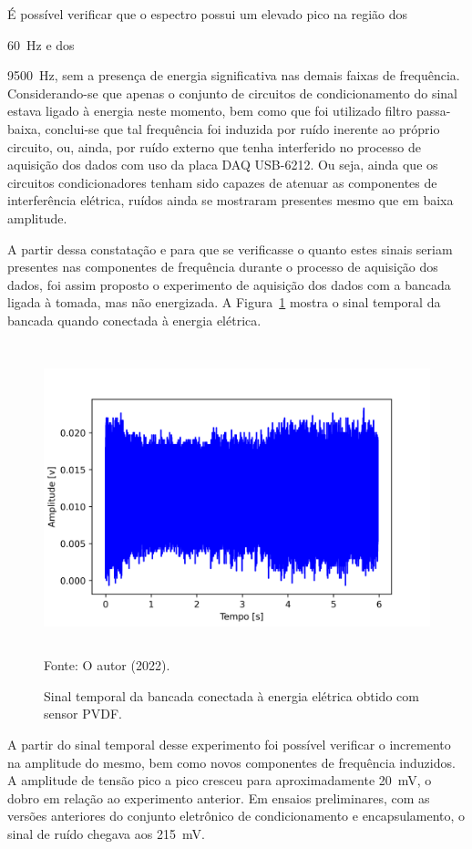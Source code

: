 \documentclass[
	12pt,				
	oneside,			
	a4paper,			
	english,			
	brazil,	
	sumario=abnt-6027-2012		
	]{abntex2ppgsi}
\begin{document}
É possível verificar que o espectro possui um elevado pico na região dos {\SI{60}{\hertz} e dos {\SI{9500}{\hertz}, sem a presença de energia significativa nas demais faixas de frequência. Considerando-se que apenas o conjunto de circuitos de condicionamento do sinal estava ligado à energia neste momento, bem como que foi utilizado filtro passa-baixa, conclui-se que tal frequência foi induzida por ruído inerente ao próprio circuito, ou, ainda, por ruído externo que tenha interferido no processo de aquisição dos dados com uso da placa DAQ USB-6212. Ou seja, ainda que os circuitos condicionadores tenham sido capazes de atenuar as componentes de interferência elétrica, ruídos ainda se mostraram presentes mesmo que em baixa amplitude. 

A partir dessa constatação e para que se verificasse o quanto estes sinais seriam presentes nas componentes de frequência durante o processo de aquisição dos dados, foi assim proposto o experimento de aquisição dos dados com a bancada ligada à tomada, mas não energizada. A Figura~\ref{maquina_ligada_na_tomada} mostra o sinal temporal da bancada quando conectada à energia elétrica.

\begin{figure}[H]
\centering
\caption {Sinal temporal da bancada conectada à energia elétrica obtido com sensor PVDF.}
\includegraphics[width=\textwidth,height=90mm,keepaspectratio]{aquisicao_02_maquina_ligada_tomada_10_03_2022_08h55min_ajustado_6s} \\
Fonte: O autor (2022).
\label{maquina_ligada_na_tomada}
\end{figure} 

A partir do sinal temporal desse experimento foi possível verificar o incremento na amplitude do mesmo, bem como novos componentes de frequência induzidos. A amplitude de tensão pico a pico cresceu para aproximadamente {\SI{20}{\milli\volt}}, o dobro em relação ao experimento anterior. Em ensaios preliminares, com as versões anteriores do conjunto eletrônico de condicionamento e encapsulamento, o sinal de ruído chegava aos {\SI{215}{\milli\volt}}. 

}}
\end{document}

